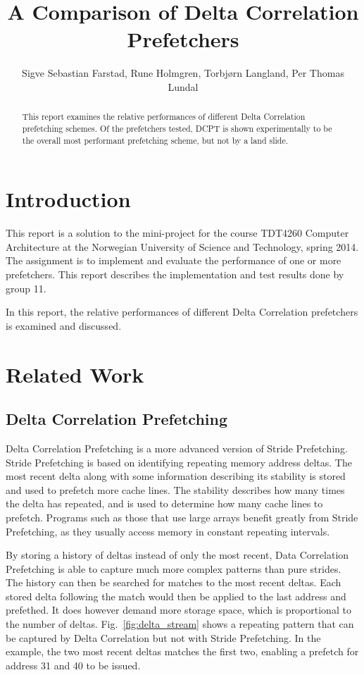\documentclass[a4paper]{IEEEtran}
\title{A Comparison of Delta Correlation Prefetchers}
\author{
    Sigve Sebastian Farstad,
    Rune Holmgren,
    Torbjørn Langland,
    Per Thomas Lundal
}
\begin{document}
\maketitle

\begin{abstract}
    This report examines the relative performances of different Delta Correlation prefetching schemes.
    Of the prefetchers tested, DCPT is shown experimentally to be the overall most performant prefetching scheme, but not by a land slide.

\end{abstract}

\section{Introduction}

This report is a solution to the mini-project for the course TDT4260 Computer Architecture at the Norwegian University of Science and Technology, spring 2014.
The assignment is to implement and evaluate the performance of one or more prefetchers. This report describes the implementation and test results done by group 11.

In this report, the relative performances of different Delta Correlation prefetchers is examined and discussed.

\section{Related Work}

\subsection{Delta Correlation Prefetching}

Delta Correlation Prefetching is a more advanced version of Stride Prefetching.
Stride Prefetching is based on identifying repeating memory address deltas.
The most recent delta along with some information describing its stability is stored and used to prefetch more cache lines.
The stability describes how many times the delta has repeated, and is used to determine how many cache lines to prefetch.
Programs such as those that use large arrays benefit greatly from Stride Prefetching, as they usually access memory in constant repeating intervals.

By storing a history of deltas instead of only the most recent, Data Correlation Prefetching is able to capture much more complex patterns than pure strides.
The history can then be searched for matches to the most recent deltas.
Each stored delta following the match would then be applied to the last address and prefethed.
It does however demand more storage space, which is proportional to the number of deltas.
Fig.~\ref{fig:delta_stream} shows a repeating pattern that can be captured by Delta Correlation but not with Stride Prefetching.
In the example, the two most recent deltas matches the first two, enabling a prefetch for address 31 and 40 to be issued.
\end{document}
